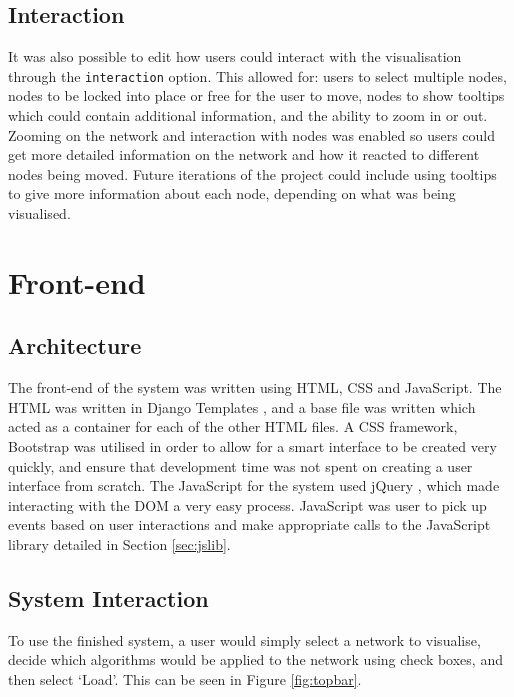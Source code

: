\documentclass[../dissertation.tex]{subfiles}
\begin{document}
\subsection{Interaction}

It was also possible to edit how users could interact with the visualisation through the \texttt{interaction} option. This allowed for: users to select multiple nodes, nodes to be locked into place or free for the user to move, nodes to show tooltips which could contain additional information, and the ability to zoom in or out. Zooming on the network and interaction with nodes was enabled so users could get more detailed information on the network and how it reacted to different nodes being moved. Future iterations of the project could include using tooltips to give more information about each node, depending on what was being visualised.

\section{Front-end}

\subsection{Architecture}

The front-end of the system was written using HTML, CSS and JavaScript. The HTML was written in Django Templates \cite{django-docs-templates}, and a base file was written which acted as a container for each of the other HTML files. A CSS framework, Bootstrap \cite{bootstrap} was utilised in order to allow for a smart interface to be created very quickly, and ensure that development time was not spent on creating a user interface from scratch. The JavaScript for the system used jQuery \cite{jQuery}, which made interacting with the DOM a very easy process. JavaScript was user to pick up events based on user interactions and make appropriate calls to the JavaScript library detailed in Section \ref{sec:jslib}.

\subsection{System Interaction}

To use the finished system, a user would simply select a network to visualise, decide which algorithms would be applied to the network using check boxes, and then select `Load'. This can be seen in Figure \ref{fig:topbar}.
\end{document}
